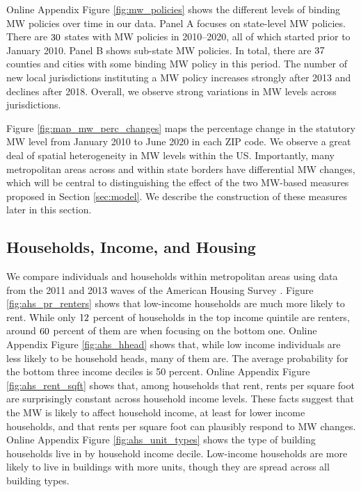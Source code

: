 Online Appendix Figure \ref{fig:mw_policies} shows the different levels of 
binding MW policies over time in our data.
Panel A focuses on state-level MW policies.
There are $\textnormal{30}$ states with MW policies in 2010--2020, all of 
which started prior to January 2010.
Panel B shows sub-state MW policies.
In total, there are $\textnormal{37}$ counties and cities with some binding MW
policy in this period.
The number of new local jurisdictions instituting a MW policy increases strongly 
after 2013 and declines after 2018.
Overall, we observe strong variations in MW levels across jurisdictions.

Figure \ref{fig:map_mw_perc_changes} maps the percentage change in 
the statutory MW level from January 2010 to June 2020 in each ZIP code.
We observe a great deal of spatial heterogeneity in MW levels within the US.
Importantly, many metropolitan areas across and within state borders have 
differential MW changes, which will be central to distinguishing the effect 
of the two MW-based measures proposed in Section \ref{sec:model}.
We describe the construction of these measures later in this section.

\subsection{Households, Income, and Housing}
\label{sec:data_income_housing}

We compare individuals and households within metropolitan areas using data 
from the 2011 and 2013 waves of the American Housing Survey \parencite{ahs2020}.
Figure \ref{fig:ahs_pr_renters} shows that low-income households are much
more likely to rent.
While only $\textnormal{12}$ percent of households in the top income quintile 
are renters, around $\textnormal{60}$ percent of them are when focusing on 
the bottom one.
Online Appendix Figure \ref{fig:ahs_hhead} shows that, while low income 
individuals are less likely to be household heads, many of them are.
The average probability for the bottom three income deciles is 50 percent.
Online Appendix Figure \ref{fig:ahs_rent_sqft} shows that, among households 
that rent, rents per square foot are surprisingly constant across household 
income levels.
These facts suggest that the MW is likely to affect household income, at least 
for lower income households, and that rents per square foot can plausibly
respond to MW changes.
Online Appendix Figure \ref{fig:ahs_unit_types} shows the type of building 
households live in by household income decile.
Low-income households are more likely to live in buildings with more units,
though they are spread across all building types.

